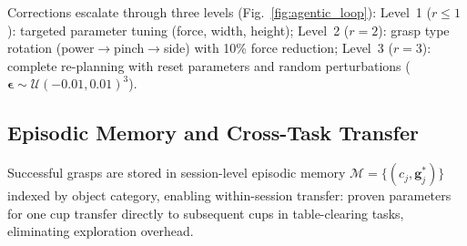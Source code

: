 \documentclass[letterpaper, 10pt, conference]{ieeeconf}
\begin{document}
Corrections escalate through three levels (Fig.~\ref{fig:agentic_loop}):
Level~1 ($r{\leq}1$): targeted parameter tuning (force, width, height);
Level~2 ($r{=}2$): grasp type rotation (power$\rightarrow$pinch$\rightarrow$side) with 10\% force reduction;
Level~3 ($r{=}3$): complete re-planning with reset parameters and random perturbations ($\boldsymbol{\epsilon} \sim \mathcal{U}(-0.01, 0.01)^3$).

\subsection{Episodic Memory and Cross-Task Transfer}
\label{sec:memory}

Successful grasps are stored in session-level episodic memory $\mathcal{M} = \{(c_j, \mathbf{g}_j^*)\}$ indexed by object category, enabling within-session transfer: proven parameters for one cup transfer directly to subsequent cups in table-clearing tasks, eliminating exploration overhead.
\end{document}
